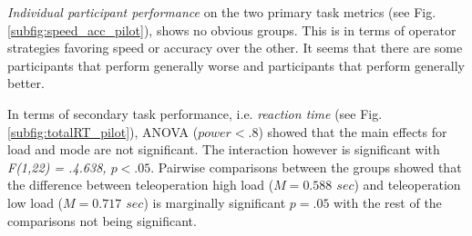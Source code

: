 \documentclass[a4paper,12pt,oneside,openright]{bhamthesis}
\begin{document}
\textit{Individual participant performance} on the two primary task metrics (see Fig. \ref{subfig:speed_acc_pilot}), shows no obvious groups. This is in terms of operator strategies favoring speed or accuracy over the other. It seems that there are some participants that perform generally worse and participants that perform generally better.

In terms of secondary task performance, i.e. \textit{reaction time} (see Fig. \ref{subfig:totalRT_pilot}), ANOVA (\textit{$power < .8$}) showed that the main effects for load and mode are not significant. The interaction however is significant with \textit{F(1,22) = .4.638, $p < .05$}. Pairwise comparisons between the groups showed that the difference between teleoperation high load (\textit{$M = 0.588$ $sec$}) and teleoperation low load (\textit{$M = 0.717$ $sec$}) is marginally significant \textit{$p =.05$} with the rest of the comparisons not being significant.
\end{document}
